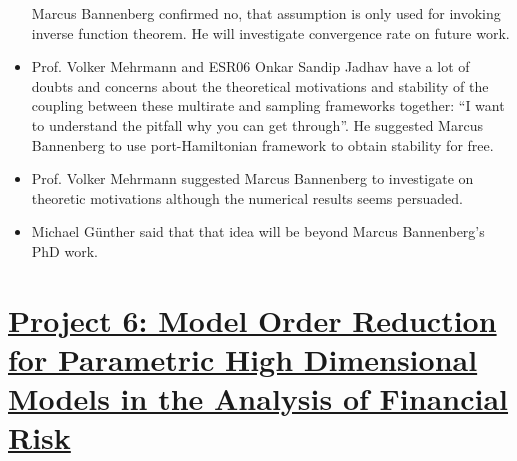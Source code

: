 \documentclass{book}
\numberwithin{equation}{section}
\begin{document}
\begin{itemize}
    Marcus Bannenberg confirmed no, that assumption is only used for invoking inverse function theorem. He will investigate convergence rate on future work.
    \item Prof. Volker Mehrmann and ESR06 Onkar Sandip Jadhav have a lot of doubts and concerns about the theoretical motivations and stability of the coupling between these multirate and sampling frameworks together: ``I want to understand the pitfall why you can get through''. He suggested Marcus Bannenberg to use port-Hamiltonian framework to obtain stability for free.
    \item Prof. Volker Mehrmann suggested Marcus Bannenberg to investigate on theoretic motivations although the numerical results seems persuaded.
    
    \item Michael Günther said that that idea will be beyond Marcus Bannenberg's PhD work.
\end{itemize}


\chapter{\href{https://www.romsoc.eu/model-order-reduction-for-parametric-high-dimensional-models-in-the-analysis-of-financial-risk/}{Project 6: Model Order Reduction for Parametric High Dimensional Models in the Analysis of Financial Risk}}
\end{document}
